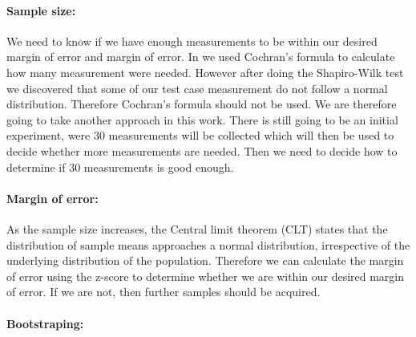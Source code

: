\paragraph{Sample size:}
We need to know if we have enough measurements to be within our desired margin of error and margin of error. In \cite{biksbois} we used Cochran's formula to calculate how many measurement were needed. However after doing the Shapiro-Wilk test we discovered that some of our test case measurement do not follow a normal distribution. Therefore Cochran's formula should not be used. We are therefore going to take another approach in this work. There is still going to be an initial experiment, were 30 measurements will be collected which will then be used to decide whether more measurements are needed. Then we need to decide how to determine if 30 measurements is good enough.

\paragraph{Margin of error:} As the sample size increases, the Central limit theorem (CLT) states that the distribution of sample means approaches a normal distribution, irrespective of the underlying distribution of the population. Therefore we can calculate the margin of error using the z-score to determine whether we are within our desired margin of error. If we are not, then further samples should be acquired.

\paragraph{Bootstraping:}



